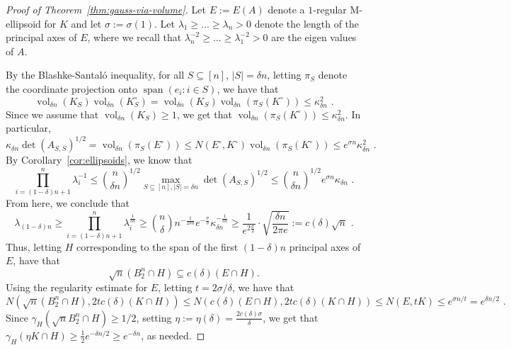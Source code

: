 \documentclass{article}
\DeclareMathOperator{\vol}{vol}
\DeclareMathOperator{\lspan}{span}
\begin{document}
\begin{proof}[Proof of Theorem~\ref{thm:gauss-via-volume}]
Let $E := E(A)$ denote a $1$-regular M-ellipsoid for $K$ and let $\sigma :=
\sigma(1)$. Let $\lambda_1 \geq \dots \geq \lambda_n > 0$ denote
the length of the principal axes of $E$, where we recall that
$\lambda_n^{-2}\geq \dots \geq \lambda_1^{-2} > 0$ are the eigen values of $A$.

By the Blashke-Santal{\'o} inequality, for all $S \subseteq
[n]$, $|S|=\delta n$, letting $\pi_S$ denote the coordinate projection onto
$\lspan(e_i:i \in S)$, we have that 
\[
\vol_{\delta n}(K_S)\vol_{\delta n}(K_S^\circ) = 
\vol_{\delta n}(K_S) \vol_{\delta n}(\pi_S(K^\circ)) \leq
\kappa_{\delta n}^2 \text{ .}
\]
Since we assume that $\vol_{\delta n}(K_S) \geq 1$, we get that
$\vol_{\delta n}(\pi_S(K^\circ)) \leq \kappa_{\delta n}^2$. In particular, 
\[
\kappa_{\delta n} \det(A_{S,S})^{1/2} = \vol_{\delta n}(\pi_S(E^\circ)) \leq N(E^\circ,K^\circ)
\vol_{ \delta n}(\pi_S(K^\circ)) \leq e^{\sigma n} \kappa_{\delta n}^2 \text{ .}
\]
By Corollary~\ref{cor:ellipsoids}, we know that
\[
\prod_{i=(1-\delta)n+1}^n \lambda_i^{-1} \leq \binom{n}{\delta n}^{1/2} \max_{S \subseteq
[n],|S|=\delta n} \det(A_{S,S})^{1/2} \leq \binom{n}{\delta n}^{1/2} e^{\sigma n}
\kappa_{\delta n} \text{ .}
\]
From here, we conclude that 
\[
\lambda_{(1-\delta)n} \geq \prod_{i=(1-\delta)n+1}^n \lambda_i^{\frac{1}{\delta
n}} \geq \binom{n}\delta {
n}^{-\frac{1}{2\delta n}} e^{-\frac{\sigma}{\delta }} \kappa_{\delta
n}^{-\frac{1}{\delta n}} \geq 
\frac{1}{e^{2\frac{\sigma}{\delta }}} \cdot \sqrt{\frac{\delta n}{2\pi e}} :=
c(\delta) \sqrt{n} \text{ .}
\] 
Thus, letting $H$ corresponding to the span of the first $(1-\delta)n$ principal
axes of $E$, have that 
\[
\sqrt{n} (B_2^n \cap H) \subseteq c(\delta) (E \cap H). 
\]
Using the regularity estimate for $E$, letting $t = 2 \sigma / \delta$, we have that
\[
N(\sqrt{n} (B_2^n \cap H), 2 t c(\delta) (K \cap H))
\leq N(c(\delta)(E \cap H), 2 t c(\delta) (K \cap H)) 
\leq N(E, t K) \leq e^{\sigma n / t} = e^{\delta n/2} \text{ .}
\] 
Since $\gamma_H(\sqrt{n} B_2^n \cap H) \geq 1/2$, setting $\eta := \eta(\delta)
=\frac{2c(\delta)\sigma}{\delta}$, we get that $\gamma_H(\eta K \cap H) \geq
\frac{1}{2} e^{-\delta n/2} \geq e^{-\delta n}$, as needed.
\end{proof}
% 
% 
\end{document}
